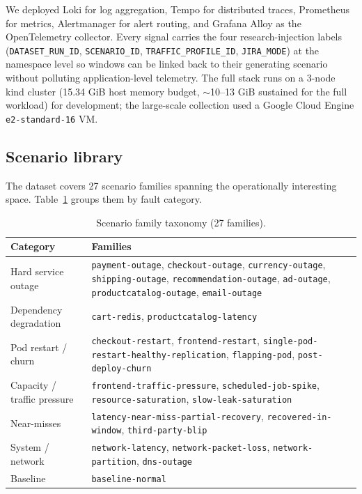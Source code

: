 We deployed Loki for log aggregation, Tempo for distributed traces, Prometheus for metrics, Alertmanager for alert routing, and Grafana Alloy as the OpenTelemetry collector. Every signal carries the four research-injection labels (\texttt{DATASET\_RUN\_ID}, \texttt{SCENARIO\_ID}, \texttt{TRAFFIC\_PROFILE\_ID}, \texttt{JIRA\_MODE}) at the namespace level so windows can be linked back to their generating scenario without polluting application-level telemetry. The full stack runs on a 3-node kind cluster (15.34 GiB host memory budget, $\sim$10--13 GiB sustained for the full workload) for development; the large-scale collection used a Google Cloud Engine \texttt{e2-standard-16} VM.

\subsection{Scenario library}

The dataset covers 27 scenario families spanning the operationally interesting space. Table~\ref{tab:scenario-families} groups them by fault category.

\begin{table}[h]
\centering
\caption{Scenario family taxonomy (27 families).}
\label{tab:scenario-families}
\small
\begin{tabularx}{\linewidth}{l X}
\toprule
Category & Families \\
\midrule
Hard service outage & \texttt{payment-outage}, \texttt{checkout-outage}, \texttt{currency-outage}, \texttt{shipping-outage}, \texttt{recommendation-outage}, \texttt{ad-outage}, \texttt{productcatalog-outage}, \texttt{email-outage} \\
Dependency degradation & \texttt{cart-redis}, \texttt{productcatalog-latency} \\
Pod restart / churn & \texttt{checkout-restart}, \texttt{frontend-restart}, \texttt{single-pod-restart-healthy-replication}, \texttt{flapping-pod}, \texttt{post-deploy-churn} \\
Capacity / traffic pressure & \texttt{frontend-traffic-pressure}, \texttt{scheduled-job-spike}, \texttt{resource-saturation}, \texttt{slow-leak-saturation} \\
Near-misses & \texttt{latency-near-miss-partial-recovery}, \texttt{recovered-in-window}, \texttt{third-party-blip} \\
System / network & \texttt{network-latency}, \texttt{network-packet-loss}, \texttt{network-partition}, \texttt{dns-outage} \\
Baseline & \texttt{baseline-normal} \\
\bottomrule
\end{tabularx}
\end{table}

